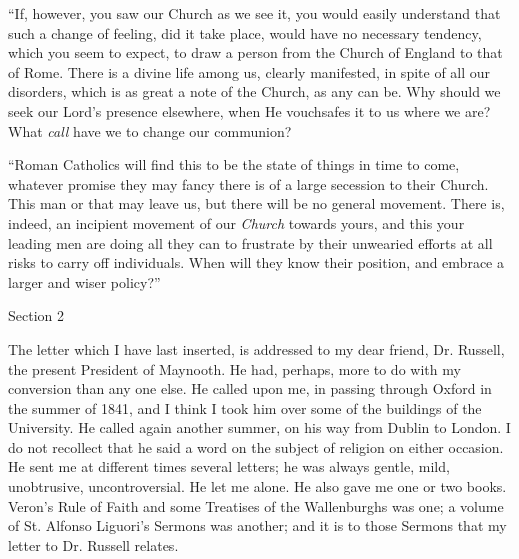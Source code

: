 ``If, however, you saw our Church as we see it, you would easily
understand that such a change of feeling, did it take place, would have
no necessary tendency, which you seem to expect, to draw a person from
the Church of England to that of Rome. There is a divine life among us,
clearly manifested, in spite of all our disorders, which is as great a
note of the Church, as any can be. Why should we seek our Lord's
presence elsewhere, when He vouchsafes it to us where we are? What \emph{call}
have we to change our communion?

``Roman Catholics will find this to be the state of things in
time to come, whatever promise they may fancy there is of a large
secession to their Church. This man or that may leave us, but there will
be no general movement. There is, indeed, an incipient movement of our \emph{Church}
towards yours, and this your leading men are doing all they can to
frustrate by their unwearied efforts at all risks to carry off
individuals. When will they know their position, and embrace a larger
and wiser policy?''

Section 2



The letter which I have last inserted, is addressed to my dear friend, Dr. Russell, the present
President of Maynooth. He had, perhaps, more to do with my conversion
than any one else. He called upon me, in passing through Oxford in the
summer of 1841, and I think I took him over some of the buildings of the
University. He called again another summer, on his way from Dublin to
London. I do not recollect that he said a word on the subject of
religion on either occasion. He sent me at different times several
letters; he was always gentle, mild, unobtrusive, uncontroversial. He
let me alone. He also gave me one or two books. Veron's Rule of Faith
and some Treatises of the Wallenburghs was one; a volume of St. Alfonso
Liguori's Sermons was another; and it is to those
Sermons that my letter to Dr. Russell relates.

